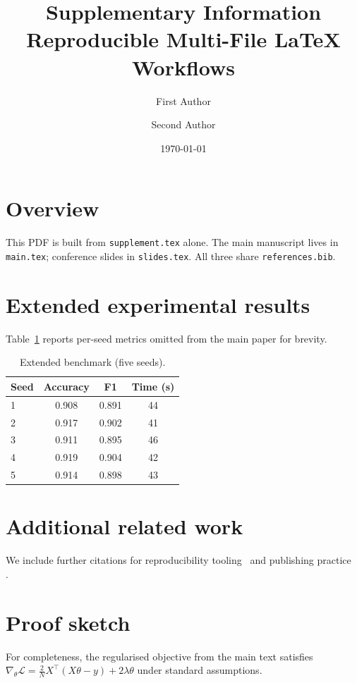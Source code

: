 \documentclass[11pt,a4paper]{article}
\title{\textbf{Supplementary Information}\\[4pt]
       \large Reproducible Multi-File \LaTeX{} Workflows}
\author{First Author \and Second Author}
\date{\today}
\begin{document}
\maketitle

\section*{Overview}
This PDF is built from \texttt{supplement.tex} alone.
The main manuscript lives in \texttt{main.tex}; conference slides in \texttt{slides.tex}.
All three share \texttt{references.bib}.

\section{Extended experimental results}
Table~\ref{tab:extended} reports per-seed metrics omitted from the main paper for brevity.

\begin{table}[htbp]
  \centering
  \caption{Extended benchmark (five seeds).}
  \label{tab:extended}
  \begin{tabular}{@{}lccc@{}}
    \toprule
    \textbf{Seed} & \textbf{Accuracy} & \textbf{F1} & \textbf{Time (s)} \\
    \midrule
    1 & 0.908 & 0.891 & 44 \\
    2 & 0.917 & 0.902 & 41 \\
    3 & 0.911 & 0.895 & 46 \\
    4 & 0.919 & 0.904 & 42 \\
    5 & 0.914 & 0.898 & 43 \\
    \bottomrule
  \end{tabular}
\end{table}

\section{Additional related work}
We include further citations for reproducibility tooling~%
\cite{example2021survey,example2025toolkit} and publishing practice~%
\cite{example2022conference}.

\section{Proof sketch}
For completeness, the regularised objective from the main text satisfies
$\nabla_\theta \mathcal{L} = \frac{2}{N} X^\top (X\theta - y) + 2\lambda\theta$ under standard assumptions.



\end{document}
